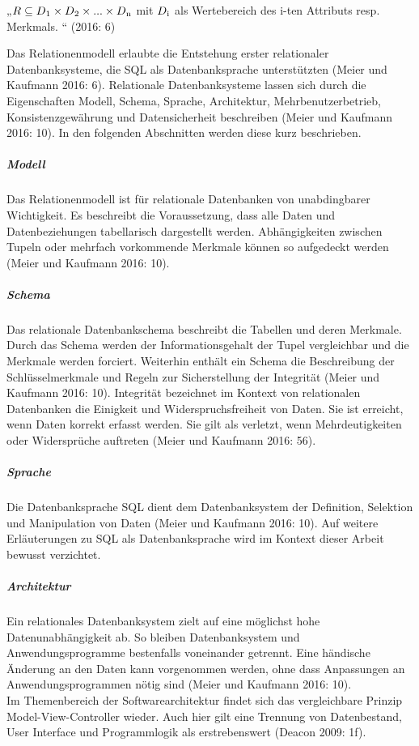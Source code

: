 \documentclass[a4paper]{scrartcl}
\begin{document}
\begin{center}
	„$ R \subseteq D \textsubscript{1} \times D \textsubscript{2} \times ... \times D \textsubscript{n} $
	mit $ D \textsubscript{i} $ als Wertebereich des i-ten Attributs resp. Merkmals. “ (2016: 6)
\end{center}
Das Relationenmodell erlaubte die Entstehung erster relationaler Datenbanksysteme, die SQL als Datenbanksprache unterstützten (Meier und Kaufmann 2016: 6). Relationale Datenbanksysteme lassen sich durch die Eigenschaften Modell, Schema, Sprache, Architektur, Mehrbenutzerbetrieb, Konsistenzgewährung und Datensicherheit beschreiben (Meier und Kaufmann 2016: 10). In den folgenden Abschnitten werden diese kurz beschrieben.

\subparagraph{Modell}
Das Relationenmodell ist für relationale Datenbanken von unabdingbarer Wichtigkeit. Es beschreibt die Voraussetzung, dass alle Daten und Datenbeziehungen tabellarisch dargestellt werden. Abhängigkeiten zwischen Tupeln oder mehrfach vorkommende Merkmale können so aufgedeckt werden (Meier und Kaufmann 2016: 10).

\subparagraph{Schema}
Das relationale Datenbankschema beschreibt die Tabellen und deren Merkmale. Durch das Schema werden der Informationsgehalt der Tupel vergleichbar und die Merkmale werden forciert. Weiterhin enthält ein Schema die Beschreibung der Schlüsselmerkmale und Regeln zur Sicherstellung der Integrität (Meier und Kaufmann 2016: 10). Integrität bezeichnet im Kontext von relationalen Datenbanken die Einigkeit und Widerspruchsfreiheit von Daten. Sie ist erreicht, wenn Daten korrekt erfasst werden. Sie gilt als verletzt, wenn Mehrdeutigkeiten oder Widersprüche auftreten (Meier und Kaufmann 2016: 56).

\subparagraph{Sprache}
Die Datenbanksprache SQL dient dem Datenbanksystem der Definition, Selektion und Manipulation von Daten (Meier und Kaufmann 2016: 10). Auf weitere Erläuterungen zu SQL als Datenbanksprache wird im Kontext dieser Arbeit bewusst verzichtet.

\subparagraph{Architektur}
Ein relationales Datenbanksystem zielt auf eine möglichst hohe Datenunabhängigkeit ab. So bleiben Datenbanksystem und Anwendungsprogramme bestenfalls voneinander getrennt. Eine händische Änderung an den Daten kann vorgenommen werden, ohne dass Anpassungen an Anwendungsprogrammen nötig sind (Meier und Kaufmann 2016: 10). \\
Im Themenbereich der Softwarearchitektur findet sich das vergleichbare Prinzip Model-View-Controller wieder. Auch hier gilt eine Trennung von Datenbestand, User Interface und Programmlogik als erstrebenswert (Deacon 2009: 1f). 
\end{document}
